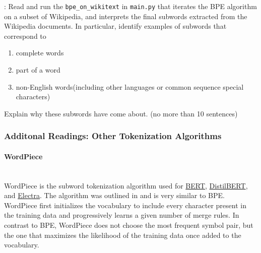 \noindent \todo{}: Read and run the \texttt{bpe\_on\_wikitext} in \texttt{main.py} that iterates the BPE algorithm on a subset of Wikipedia, and interprets the final subwords extracted from the Wikipedia documents. In particular, identify examples of subwords that correspond to
\begin{enumerate}
    \item complete words
    \item part of a word
    \item non-English words(including other languages or common sequence special characters)
\end{enumerate}
Explain why these subwords have come about. (no more than 10 sentences)

\subsubsection{Additonal Readings: Other Tokenization Algorithms}
\paragraph{WordPiece}\mbox{}\\
WordPiece is the subword tokenization algorithm used for \href{https://huggingface.co/docs/transformers/main/en/model_doc/bert}{BERT}, \href{https://huggingface.co/docs/transformers/main/en/model_doc/distilbert}{DistilBERT}, and \href{https://huggingface.co/docs/transformers/main/en/model_doc/electra}{Electra}. The algorithm was outlined in \citep{Schuster2012JapaneseAK} and is very similar to
BPE. WordPiece first initializes the vocabulary to include every character present in the training data and progressively learns a given number of merge rules. In contrast to BPE, WordPiece does not choose the most frequent symbol pair, but the one that maximizes the likelihood of the training data once added to the vocabulary.

